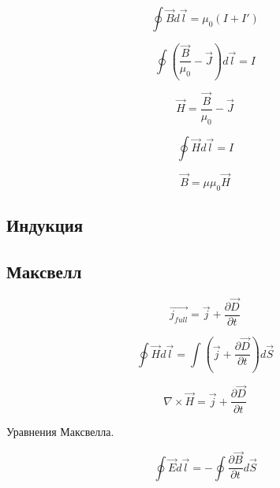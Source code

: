 \begin{equation}
\oint \overrightarrow{B} d \overrightarrow{l} = \mu_0 (I+I')
\end{equation}

\begin{equation}
\oint ( \frac{\overrightarrow{B}}{\mu_0} - \overrightarrow{J}) d \overrightarrow{l} = I
\end{equation}

\begin{equation}
\overrightarrow{H} = \frac{\overrightarrow{B}}{\mu_0} - \overrightarrow{J}
\end{equation}


\begin{equation}
\oint \overrightarrow{H} d \overrightarrow{l} = I
\end{equation}


\begin{equation}
\overrightarrow{B} = \mu \mu_0 \overrightarrow{H}
\end{equation}


\subsection{Индукция}
\subsection{Максвелл}


\begin{equation}
\overrightarrow{j_{full}} = \overrightarrow{j} + \frac{\partial \overrightarrow{D}}{\partial t}
\end{equation}

\begin{equation}
\oint \overrightarrow{H} d \overrightarrow{l} = \int (\overrightarrow{j} + \frac{\partial \overrightarrow{D}}{\partial t}) d\overrightarrow{S}
\end{equation}


\begin{equation}
\nabla \times \overrightarrow{H} = \overrightarrow{j} + \frac{\partial \overrightarrow{D}}{\partial t}
\end{equation}


Уравнения Максвелла.


\begin{equation}
\oint \overrightarrow{E} d \overrightarrow{l} = - \oint  \frac{\partial \overrightarrow{B}}{\partial t} d\overrightarrow{S}
\end{equation}

